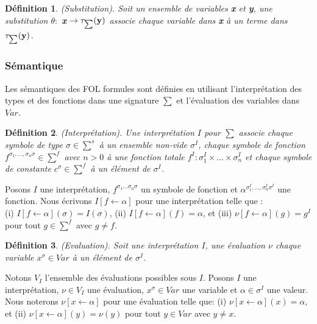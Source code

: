 \documentclass[11pt,openany]{article}
\newcommand\smallsum{\mathsmaller\sum}
\newtheorem{definition}{D\'efinition}[subsection]
\begin{document}
\begin{definition}
(Substitution). Soit un ensemble de variables \textbf{x} et \textbf{y}, une substitution $\theta :$ \textbf{x} $\rightarrow \tau_{\smallsum}(\textbf{y})$ associe chaque variable dans \textbf{x} \`a un terme dans $\tau_{\mathsmaller\sum}(\textbf{y})$.
\end{definition}
	\subsubsection{S\'emantique}
	Les s\'emantiques des FOL formules sont d\'efinies en utilisant l'interpr\'etation des types et des fonctions dans une signature $\sum$ et l'\'evaluation des variables dans $Var$.
\begin{definition}
(Interpr\'etation). Une interpr\'etation $I$ pour $\sum$ associe chaque symbole de type $\sigma \in \sum^{s}$ \`a un ensemble non-vide $\sigma^{I}$, chaque symbole de fonction $f^{\sigma_{1},...,\sigma_{n}\sigma} \in \sum^{f}$ avec $n > 0$ \`a une fonction totale $f^{I} : \sigma_{1}^{I}\times ... \times \sigma_{n}^{I}$ et chaque symbole de constante $c^{\sigma} \in \sum^{f}$ \`a un \'el\'ement de $\sigma^{I}$.
\end{definition}
	Posons $I$ une interpr\'etation, $f^{\sigma_{1} ...\sigma_{n} \sigma}$ un symbole de fonction et $\alpha^{\sigma_{1}^{I},...,\sigma_{n}^{I}\sigma^{I}}$ une fonction. Nous \'ecrivons $I[f \leftarrow \alpha]$ pour une interpr\'etation telle que : \\(i) $I[f\leftarrow\alpha](\sigma) = I(\sigma)$, (ii) $I[f\leftarrow\alpha](f) = \alpha$, et (iii) $\nu[f\leftarrow\alpha](g) = g^{I}$ pour tout $g \in \sum^{f}$ avec $g\neq f$.
	
\begin{definition}
(Evaluation). Soit une interpr\'etation $I$, une \'evaluation $\nu$ chaque variable $x^{\sigma} \in Var$ \`a un \'el\'ement de $\sigma^{I}$.
\end{definition}
Notons $V_{I}$ l'ensemble des \'evaluations possibles sous $I$.
Posons $I$ une interpr\'etation, $\nu \in V_{I}$ une \'evaluation, $x^{\sigma} \in Var$ une variable et $\alpha \in \sigma^{I}$ une valeur. Nous noterons $\nu[x\leftarrow\alpha]$ pour une \'evaluation telle que: (i) $\nu[x\leftarrow\alpha](x) = \alpha$, et (ii) $\nu[x\leftarrow\alpha](y)=\nu(y)$ pour tout $y\in Var$ avec $y\neq x$.
\end{document}

